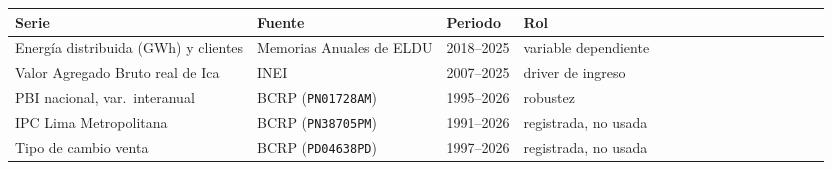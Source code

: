 
\begin{tabular}{lllp{2.4cm}lllp{2.4cm}lllp{2.4cm}lllp{2.4cm}}
\toprule
Serie & Fuente & Periodo & Rol\\
\midrule
Energía distribuida (GWh) y clientes & Memorias Anuales de ELDU & 2018--2025 & variable dependiente\\
Valor Agregado Bruto real de Ica & INEI & 2007--2025 & driver de ingreso\\
PBI nacional, var.\ interanual & BCRP (\texttt{PN01728AM}) & 1995--2026 & robustez\\
IPC Lima Metropolitana & BCRP (\texttt{PN38705PM}) & 1991--2026 & registrada, no usada\\
Tipo de cambio venta & BCRP (\texttt{PD04638PD}) & 1997--2026 & registrada, no usada\\
\bottomrule
\end{tabular}
